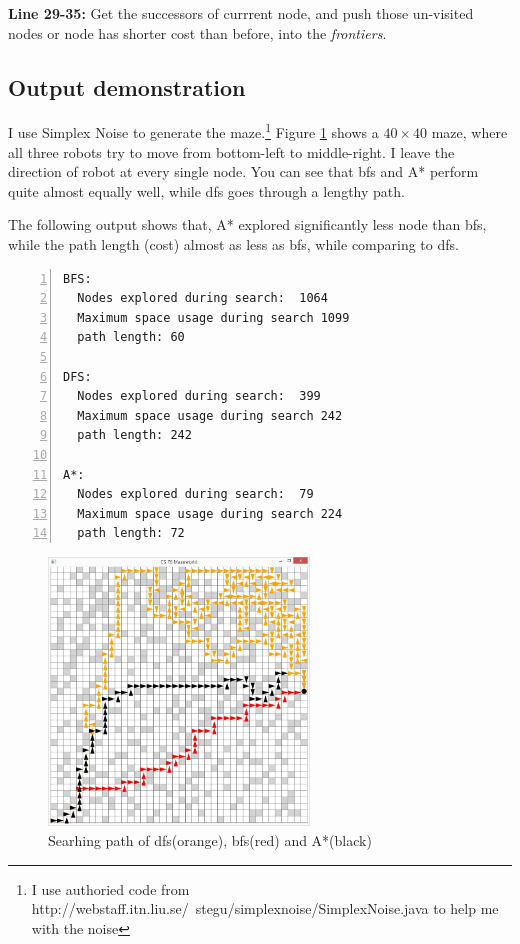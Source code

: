 \textbf{Line 29-35:} Get the successors of currrent node, and push those un-visited nodes or node has shorter cost than before, into the \emph{frontiers}.



\subsection{Output demonstration}



I use Simplex Noise to generate the maze.\footnote{I use authoried code from http://webstaff.itn.liu.se/~stegu/simplexnoise/SimplexNoise.java to help me with the noise} Figure \ref{s-1} shows a $40\times40$ maze, where all three robots try to move from bottom-left to middle-right. I leave the direction of robot at every single node. You can see that bfs and A* perform quite almost equally well, while dfs goes through a lengthy path. 

The following output shows that, A* explored significantly less node than bfs, while the path length (cost) almost as less as bfs, while comparing to dfs.



\begin{lstlisting}[numbers=left]
BFS:  
  Nodes explored during search:  1064
  Maximum space usage during search 1099
  path length: 60
  
DFS:  
  Nodes explored during search:  399
  Maximum space usage during search 242
  path length: 242
  
A*:  
  Nodes explored during search:  79
  Maximum space usage during search 224
  path length: 72
\end{lstlisting}


\begin{figure}[!h]
\centering
\includegraphics[width=0.618\textwidth]{s-1-1.JPG}
\caption{Searhing path of dfs(orange), bfs(red) and A*(black)}
\label{s-1}
\end{figure}




